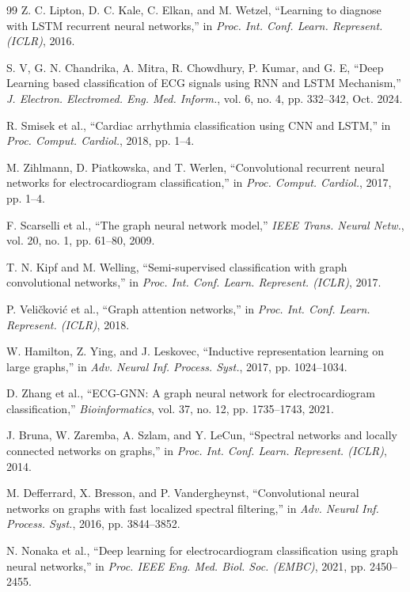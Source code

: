 \documentclass[12pt,a4paper]{report}
\begin{document}
\begin{thebibliography}{99}
Z. C. Lipton, D. C. Kale, C. Elkan, and M. Wetzel, ``Learning to diagnose with LSTM recurrent neural networks,'' in \textit{Proc. Int. Conf. Learn. Represent. (ICLR)}, 2016.

S. V, G. N. Chandrika, A. Mitra, R. Chowdhury, P. Kumar, and G. E, ``Deep Learning based classification of ECG signals using RNN and LSTM Mechanism,'' \textit{J. Electron. Electromed. Eng. Med. Inform.}, vol. 6, no. 4, pp. 332--342, Oct. 2024.

R. Smisek et al., ``Cardiac arrhythmia classification using CNN and LSTM,'' in \textit{Proc. Comput. Cardiol.}, 2018, pp. 1--4.

M. Zihlmann, D. Piatkowska, and T. Werlen, ``Convolutional recurrent neural networks for electrocardiogram classification,'' in \textit{Proc. Comput. Cardiol.}, 2017, pp. 1--4.

F. Scarselli et al., ``The graph neural network model,'' \textit{IEEE Trans. Neural Netw.}, vol. 20, no. 1, pp. 61--80, 2009.

T. N. Kipf and M. Welling, ``Semi-supervised classification with graph convolutional networks,'' in \textit{Proc. Int. Conf. Learn. Represent. (ICLR)}, 2017.

P. Veličković et al., ``Graph attention networks,'' in \textit{Proc. Int. Conf. Learn. Represent. (ICLR)}, 2018.

W. Hamilton, Z. Ying, and J. Leskovec, ``Inductive representation learning on large graphs,'' in \textit{Adv. Neural Inf. Process. Syst.}, 2017, pp. 1024--1034.

D. Zhang et al., ``ECG-GNN: A graph neural network for electrocardiogram classification,'' \textit{Bioinformatics}, vol. 37, no. 12, pp. 1735--1743, 2021.

J. Bruna, W. Zaremba, A. Szlam, and Y. LeCun, ``Spectral networks and locally connected networks on graphs,'' in \textit{Proc. Int. Conf. Learn. Represent. (ICLR)}, 2014.

M. Defferrard, X. Bresson, and P. Vandergheynst, ``Convolutional neural networks on graphs with fast localized spectral filtering,'' in \textit{Adv. Neural Inf. Process. Syst.}, 2016, pp. 3844--3852.

N. Nonaka et al., ``Deep learning for electrocardiogram classification using graph neural networks,'' in \textit{Proc. IEEE Eng. Med. Biol. Soc. (EMBC)}, 2021, pp. 2450--2455.


\end{thebibliography}
\end{document}
